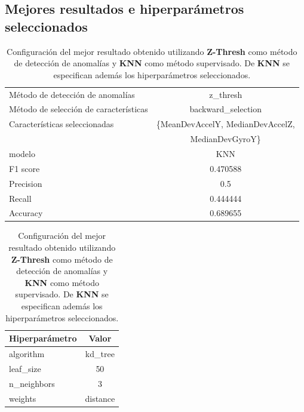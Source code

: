 \begin{appendices}
	\newpage
	\section*{Mejores resultados e hiperparámetros seleccionados}
		\begin{table}[htb]
			\centering
			\caption{Configuración del mejor resultado obtenido utilizando \textbf{Z-Thresh} como método de detección de anomalías y \textbf{KNN}
			como método supervisado. De \textbf{KNN} se especifican además los hiperparámetros seleccionados.}
			\label{table:17}
			\begin{tabular}{lc}
				\toprule
					  Método de detección de anomalías &                                         z\_thresh \\
				Método de selección de características &                               backward\_selection \\
						 Características seleccionadas & \{MeanDevAccelY, MedianDevAccelZ,    \\
						 							   &									MedianDevGyroY\} \\
												modelo &                                              KNN \\
											  F1 score &                                         0.470588 \\
											 Precision &                                              0.5 \\
												Recall &                                         0.444444 \\
											  Accuracy &                                         0.689655 \\
				\bottomrule
			\end{tabular}
			\newline
			\newline

			\begin{tabular}{lc}
				\toprule
				Hiperparámetro &    Valor \\
				\midrule
					 algorithm &  kd\_tree \\
					 leaf\_size &       50 \\
				   n\_neighbors &        3 \\
					   weights & distance \\
				\bottomrule
			\end{tabular}
			
			
		\end{table}


\end{appendices}

